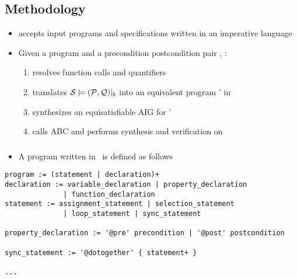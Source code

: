 \subsection*{Methodology}
\begin{frame}{\mytool{}}
 \begin{itemize}
  \item \mytool{} accepts input programs and specifications written in an imperative language
  \psqlanguage
  \item Given a program \Pm and a precondition postcondition pair \pair{\Pre}{\Post},  \mytool{}:
  \begin{enumerate}
   \item resolves function calls and quantifiers
   \item translates $\mathcal{S} \models (\mathcal{P}, \mathcal{Q})|_b $ into an equivalent program \Pm' in \thislanguage
   \item synthesizes \aigcircuit an equisatisfiable AIG for \Pm'
   \item calls ABC and performs synthesis and verification on \aigcircuit
  \end{enumerate}
 \end{itemize}
\end{frame}

\begin{frame}[containsverbatim]
\frametitle{\psqlanguage}
\begin{itemize}
 \item A program written in \psqlanguage~is defined as follows
\end{itemize}
\begin{Verbatim}[fontsize=\relsize{-2.0}]
program := (statement | declaration)+
declaration := variable_declaration | property_declaration 
              | function_declaration
statement := assignment_statement | selection_statement 
              | loop_statement | sync_statement

property_declaration := '@pre' precondition | '@post' postcondition

sync_statement := '@dotogether' { statement+ }

... 
\end{Verbatim}
\end{frame}

